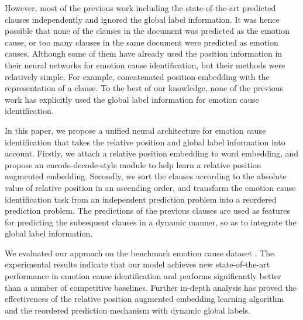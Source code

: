 \documentclass[letterpaper]{article} \usepackage{aaai19}  \usepackage{times}  \usepackage{helvet}  \usepackage{courier}  \usepackage{url}  \usepackage{graphicx}  \frenchspacing  \setlength{\pdfpagewidth}{8.5in}  \setlength{\pdfpageheight}{11in}  \setcounter{secnumdepth}{0}
\begin{document}
However, most of the previous work including the state-of-the-art predicted clauses independently and ignored the global label information. It was hence possible that none of the clauses in the document was predicted as the emotion cause, or too many clauses in the same document were predicted as emotion causes. Although some of them have already used the position information in their neural networks for emotion cause identification, but their methods were relatively simple. For example, \cite{gui2016event,gui2017question,xu2017ensemble} concatenated position embedding with the representation of a clause. To the best of our knowledge, none of the previous work has explicitly used the global label information for emotion cause identification.


In this paper, we propose a unified neural architecture for emotion cause identification that takes the relative position and global label information into account. Firstly, we attach a relative position embedding to word embedding, and propose an encode-decode-style module to help learn a relative position augmented embedding. Secondly, we sort the clauses according to the absolute value of relative position in an ascending order, and transform the emotion cause identification task from an independent prediction problem into a reordered prediction problem. The predictions of the previous clauses are used as features for predicting the subsequent clauses in a dynamic manner, so as to integrate the global label information.

We evaluated our approach on the benchmark emotion cause dataset \cite{gui2016event}. The experimental results indicate that our model achieves new state-of-the-art performance in emotion cause identification and performs significantly better than a number of competitive baselines. Further in-depth analysis has proved the effectiveness of the relative position augmented embedding learning algorithm and the reordered prediction mechanism with dynamic global labels.
\end{document}
